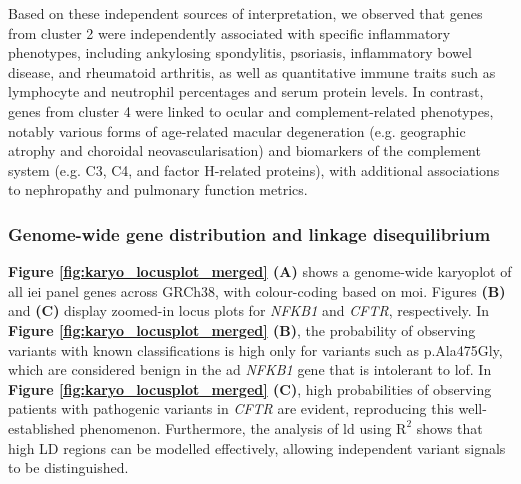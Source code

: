 Based on these independent sources of interpretation, we observed that genes from cluster 2 were independently associated with specific inflammatory phenotypes, including ankylosing spondylitis, psoriasis, inflammatory bowel disease, and rheumatoid arthritis, as well as quantitative immune traits such as lymphocyte and neutrophil percentages and serum protein levels.
In contrast, genes from cluster 4 were linked to ocular and complement-related phenotypes, notably various forms of age-related macular degeneration (e.g. geographic atrophy and choroidal neovascularisation) and biomarkers of the complement system (e.g. C3, C4, and factor H-related proteins), with additional associations to nephropathy and pulmonary function metrics.

\subsubsection{Genome-wide gene distribution and linkage disequilibrium}

\textbf{Figure \ref{fig:karyo_locusplot_merged} (A)} shows a genome-wide karyoplot of all \ac{iei} panel genes across GRCh38, with colour-coding based on \ac{moi}. Figures \textbf{(B)} and \textbf{(C)} display zoomed-in locus plots for \textit{NFKB1} and \textit{CFTR}, respectively. 
In \textbf{Figure \ref{fig:karyo_locusplot_merged} (B)}, the probability of observing variants with known classifications is high only for variants such as p.Ala475Gly, which are considered benign in the \ac{ad} \textit{NFKB1} gene that is intolerant to \ac{lof}. 
In \textbf{Figure \ref{fig:karyo_locusplot_merged} (C)}, high probabilities of observing patients with pathogenic variants in \textit{CFTR} are evident, reproducing this well-established phenomenon. Furthermore, the analysis of \ac{ld} using $\text{R}^2$ shows that high LD regions can be modelled effectively, allowing independent variant signals to be distinguished.

